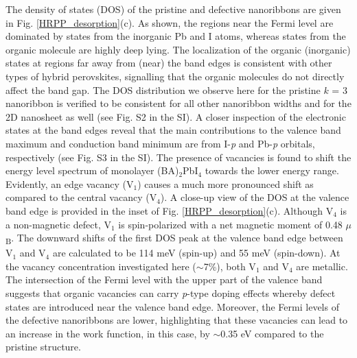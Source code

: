 \documentclass[aps,prl,preprint,11pt,superscriptaddress,bibnotes,amsmath,amssymb,amsfonts,showkeys]{revtex4-2}
\begin{document}
The density of states (DOS) of the pristine and defective nanoribbons are given in Fig. \ref{HRPP_desorption}(c). As shown, the regions near the Fermi level are dominated by states from the inorganic Pb and I atoms, whereas states from the organic molecule are highly deep lying. The localization of the organic (inorganic) states at regions far away from (near) the band edges is consistent with other types of hybrid perovskites,\cite{SCqwell16,WLdos18,SSdos17,BYdos14} signalling that the organic molecules do not directly affect the band gap. The DOS distribution we observe here for the pristine $k$ = 3 nanoribbon is verified to be consistent for all other nanoribbon widths and for the 2D nanosheet as well (see Fig. S2 in the SI). A closer inspection of the electronic states at the band edges reveal that the main contributions to the valence band maximum and conduction band minimum are from I-\textit{p} and Pb-\textit{p} orbitals, respectively (see Fig. S3 in the SI). The presence of vacancies is found to shift the energy level spectrum of monolayer (BA)$_2$PbI$_4$ towards the lower energy range. Evidently, an edge vacancy (V$_1$) causes a much more pronounced shift as compared to the central vacancy (V$_4$). A close-up view of the DOS at the valence band edge is provided in the inset of Fig. \ref{HRPP_desorption}(c). Although V$_4$ is a non-magnetic defect, V$_1$ is spin-polarized with a net magnetic moment of 0.48 $\mu$\textsubscript{B}. The downward shifts of the first DOS peak at the valence band edge between V$_1$ and V$_4$ are calculated to be 114 meV (spin-up) and 55 meV (spin-down). At the vacancy concentration investigated here ($\sim$7\%), both V$_1$ and V$_4$ are metallic. The intersection of the Fermi level with the upper part of the valence band suggests that organic vacancies can carry \textit{p}-type doping effects whereby defect states are introduced near the valence band edge. Moreover, the Fermi levels of the defective nanoribbons are lower, highlighting that these vacancies can lead to an increase in the work function, in this case, by $\sim$0.35 eV compared to the pristine structure.
\end{document}
